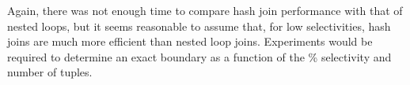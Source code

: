 \documentclass[paper=letter, fontsize=11pt]{scrartcl}
\numberwithin{equation}{section}
\numberwithin{figure}{section}
\numberwithin{table}{section}
\begin{document}
Again, there was not enough time to compare hash join performance with that of nested loops, but it seems reasonable to assume that, for low selectivities, hash joins are much more efficient than nested loop joins.  Experiments would be required to determine an exact boundary as a function of the \% selectivity and number of tuples.
\end{document}
